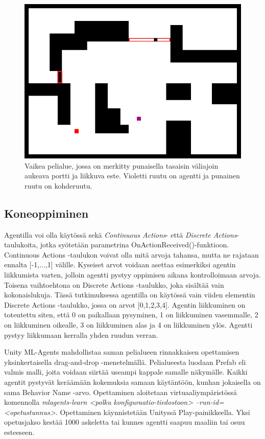 \documentclass[utf8]{gradu3}
\begin{document}
\begin{figure}[h]
\includegraphics[width=13cm]{area_difficult.png}
\centering
\caption{Vaikea pelialue, jossa on merkitty punaisella tasaisin väliajoin aukeava portti ja liikkuva este. Violetti ruutu on agentti ja punainen ruutu on kohderuutu.}
\label{areadifficult}
\end{figure}

\subsection{Koneoppiminen}
\label{koneoppiminen}

Agentilla voi olla käytössä sekä \textit{Continuous Actions}- että \textit{Discrete Actions}-taulukoita, jotka syötetään parametrina OnActionReceived()-funktioon. Continuous Actions -taulukon voivat olla mitä arvoja tahansa, mutta ne rajataan ennalta [-1,...,1] välille. Kyseiset arvot voidaan asettaa esimerkiksi agentin liikkumista varten, jolloin agentti pystyy oppimisen aikana kontrolloimaan arvoja. Toisena vaihtoehtona on Discrete Actions -taulukko, joka sisältää vain kokonaislukuja. Tässä tutkimuksessa agentilla on käytössä vain viiden elementin Discrete Actions -taulukko, jossa on arvot [0,1,2,3,4]. Agentin liikkuminen on toteutettu siten, että 0 on paikallaan pysyminen, 1 on liikkuminen vasemmalle, 2 on liikkuminen oikealle, 3 on liikkuminen alas ja 4 on liikkuminen ylös. Agentti pystyy liikkumaan kerralla yhden ruudun verran.

Unity ML-Agents mahdollistaa saman pelialueen rinnakkaisen opettamisen yksinkertaisella drag-and-drop -menetelmällä. Pelialueesta luodaan Prefab eli valmis malli, joita voidaan siirtää useampi kappale samalle näkymälle. Kaikki agentit pystyvät keräämään kokemuksia samaan käytäntöön, kunhan jokaisella on sama Behavior Name -arvo. Opettaminen aloitetaan virtuaaliympäristössä komennolla \textit{mlagents-learn <polku konfiguraatio-tiedostoon> --run-id=<opetustunnus>}. Opettaminen käynnistetään Unityssä Play-painikkeella. Yksi opetusjakso kestää 1000 askeletta tai kunnes agentti saapuu maaliin tai osuu esteeseen.
\end{document}
